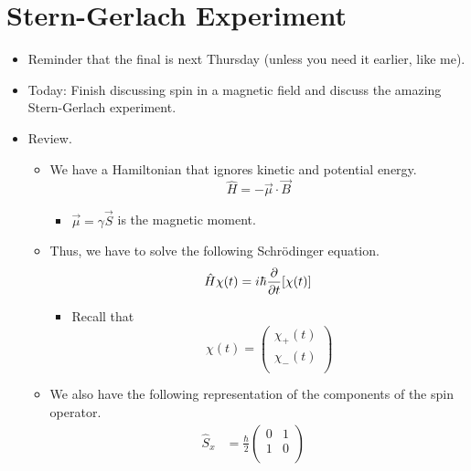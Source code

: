 \documentclass[../notes.tex]{subfiles}
\begin{document}
\section{Stern-Gerlach Experiment}
\begin{itemize}
    \item {}Reminder that the final is next Thursday (unless you need it earlier, like me).
    \item Today: Finish discussing spin in a magnetic field and discuss the amazing Stern-Gerlach experiment.
    \item Review.
    \begin{itemize}
        \item We have a Hamiltonian that ignores kinetic and potential energy.
        \begin{equation*}
            \hat{H} = -\vec{\mu}\cdot\vec{B}
        \end{equation*}
        \begin{itemize}
            \item $\vec{\mu}=\gamma\vec{S}$ is the magnetic moment.
        \end{itemize}
        \item Thus, we have to solve the following Schr\"{o}dinger equation.
        \begin{equation*}
            \hat{H}\chi(t) = i\hbar\pdv{t}[\chi(t)]
        \end{equation*}
        \begin{itemize}
            \item Recall that
            \begin{equation*}
                \chi(t) =
                \begin{pmatrix}
                    \chi_+(t)\\
                    \chi_-(t)\\
                \end{pmatrix}
            \end{equation*}
        \end{itemize}
        \item We also have the following representation of the components of the spin operator.
        \begin{align*}
            \hat{S}_x &= \frac{\hbar}{2}
            \begin{pmatrix}
                0 & 1\\
                1 & 0\\
            \end{pmatrix}&

\end{align*}
\end{itemize}
\end{itemize}
\end{document}
